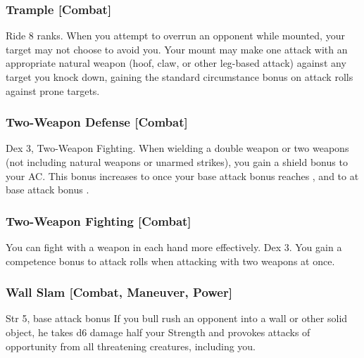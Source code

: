 \subsubsection{Trample [Combat]}
 Ride 8 ranks.
 When you attempt to overrun an opponent while mounted, your target may not choose to avoid you. Your mount may make one attack with an appropriate natural weapon (hoof, claw, or other leg-based attack) against any target you knock down, gaining the standard  circumstance bonus on attack rolls against prone targets.

\subsubsection{Two-Weapon Defense [Combat]}
 Dex 3, Two-Weapon Fighting.
 When wielding a double weapon or two weapons (not including natural weapons or unarmed strikes), you gain a  shield bonus to your AC. This bonus increases to  once your base attack bonus reaches , and to  at base attack bonus .

\subsubsection{Two-Weapon Fighting [Combat]}
You can fight with a weapon in each hand more effectively.
 Dex 3.
 You gain a  competence bonus to attack rolls when attacking with two weapons at once.


\subsubsection{Wall Slam [Combat, Maneuver, Power]}
\featpre Str 5, base attack bonus 
\featben If you bull rush an opponent into a wall or other solid object, he takes d6 damage \add half your Strength and provokes attacks of opportunity from all threatening creatures, including you.

